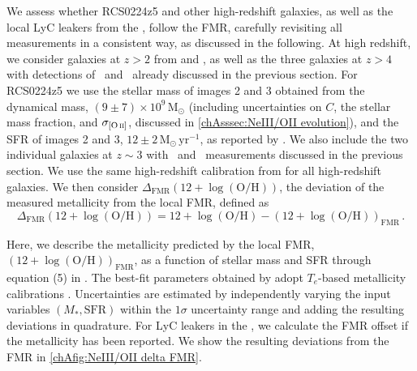 We assess whether RCS0224z5 and other high-redshift galaxies, as well as the local LyC leakers from the \Isample, follow the FMR, carefully revisiting all measurements in a consistent way, as discussed in the following. At high redshift, we consider galaxies at $z > 2$ from \citet{2021ApJ...914...19S} and \citet{2014A&A...563A..58T}, as well as the three galaxies at $z > 4$ with detections of \NeIII\ and \OII\ already discussed in the previous section. For RCS0224z5 we use the stellar mass of images 2 and 3 obtained from the dynamical mass, $(9 \pm 7) \times 10^{9} \, \mathrm{M}_\odot$ (including uncertainties on $C$, the stellar mass fraction, and $\sigma_\OII$, discussed in \cref{chAsssec:NeIII/OII evolution}), and the SFR of images 2 and 3, $12 \pm 2 \, \mathrm{M_\odot \, yr^{-1}}$, as reported by \citet{2007MNRAS.376..479S}. We also include the two individual galaxies at $z \sim 3$ with \NeIII\ and \OII\ measurements discussed in the previous section. We use the same high-redshift calibration from \citet{2018ApJ...859..175B} for all high-redshift galaxies. We then consider $\Delta_\text{FMR} ( 12 + \log ( \text{O/H} ))$, the deviation of the measured metallicity from the local FMR, defined as
\begin{equation}
    \Delta_\text{FMR} \left( 12 + \log \left ( \text{O/H} \right) \right) = 12 + \log \left( \text{O/H} \right) - \left( 12 + \log \left ( \text{O/H} \right) \right)_\text{FMR} \, .
\end{equation}

Here, we describe the metallicity predicted by the local FMR, $( 12 + \log ( \text{O/H} ))_\text{FMR}$, as a function of stellar mass and SFR through equation (5) in \citet{2020MNRAS.491..944C}. The best-fit parameters obtained by \citeauthor{2020MNRAS.491..944C} adopt $T_e$-based metallicity calibrations \citep[as][, but based on the full SDSS dataset]{2018ApJ...859..175B}. Uncertainties are estimated by independently varying the input variables $(M_*, \text{SFR})$ within the $1 \sigma$ uncertainty range and adding the resulting deviations in quadrature. For LyC leakers in the \Isample, we calculate the FMR offset if the metallicity has been reported. We show the resulting deviations from the FMR in \cref{chAfig:NeIII/OII delta FMR}.

